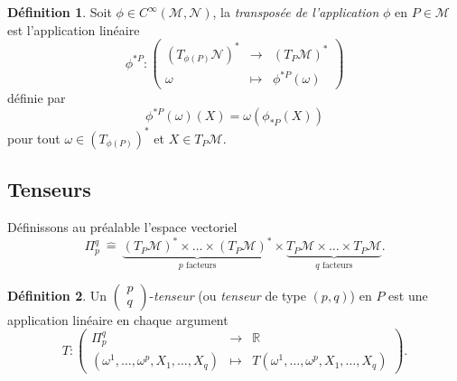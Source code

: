 \documentclass[a4paper,11pt]{report}
\theoremstyle{definition}
\theoremstyle{plain}
\theoremstyle{definition}
\newtheorem{defn}{Définition}[chapter]
\theoremstyle{remark}
\newcommand{\M}{\mathscr{M}}
\newcommand{\N}{\mathscr{N}}
\newcommand{\tens}[2]{\begin{pmatrix}#1\\#2\end{pmatrix}}
\begin{document}
                \begin{defn}
                    Soit $\phi\in C^\infty(\M,\N)$, la \textit{transposée de l'application} $\phi$ en $P\in\M$ est l'application linéaire
                    \begin{equation}
                        \phi^{*P}:\left(
                    \begin{array}{ccc}
                        (T_{\phi(P)}\N)^* & \longrightarrow & (T_P\M)^* \\
                        \omega & \longmapsto & \phi^{*P}(\omega)
                    \end{array}
                    \right)
                    \end{equation}
                    définie par
                    \begin{equation}
                        \phi^{*P}(\omega)(X) = \omega(\phi_{*P}(X))
                    \end{equation}
                    pour tout $\omega\in (T_{\phi(P)})^*$ et $X\in T_P\M$.
                \end{defn}
            
            \subsection{Tenseurs}
                
                Définissons au préalable l'espace vectoriel
                \begin{equation}
                    \Pi^q_p ~\hat{=}~ \underbrace{(T_P\M)^*\times\dots\times (T_P\M)^*}_{\text{$p$ facteurs}}\times\underbrace{T_P\M\times\dots\times T_P\M}_{\text{$q$ facteurs}}.
                \end{equation}
                
                \begin{defn}
                    Un $\tens{p}{q}$-\textit{tenseur} (ou \textit{tenseur} de type $(p,q)$) en $P$ est une application linéaire en chaque argument
                    \begin{equation}
                        T:\left(
                    \begin{array}{ccc}
                        \Pi^q_p & \longrightarrow & \mathbb{R} \\
                        (\omega^1,\dots,\omega^p,X_1,\dots,X_q) & \longmapsto & T(\omega^1,\dots,\omega^p,X_1,\dots,X_q)
                    \end{array}
                    \right).
                    \end{equation}
                \end{defn}
                
\end{document}
